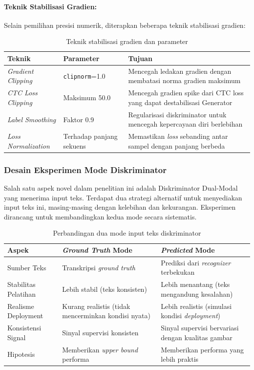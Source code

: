 \documentclass[12pt,a4paper]{article}
\begin{document}
\paragraph{Teknik Stabilisasi Gradien:}
Selain pemilihan presisi numerik, diterapkan beberapa teknik stabilisasi gradien:

\begin{table}[H]
\centering
\caption{Teknik stabilisasi gradien dan parameter}
\label{tab:gradient-stabilization}
\small
\begin{tabular}{|l|l|p{6.5cm}|}
\hline
\textbf{Teknik} & \textbf{Parameter} & \textbf{Tujuan} \\ \hline
\textit{Gradient Clipping} & \texttt{clipnorm}=1.0 & Mencegah ledakan gradien dengan membatasi norma gradien maksimum \\ \hline
\textit{CTC Loss Clipping} & Maksimum 50.0 & Mencegah gradien spike dari CTC loss yang dapat destabilisasi Generator \\ \hline
\textit{Label Smoothing} & Faktor 0.9 & Regularisasi diskriminator untuk mencegah kepercayaan diri berlebihan \\ \hline
\textit{Loss Normalization} & Terhadap panjang sekuens & Memastikan \textit{loss} sebanding antar sampel dengan panjang berbeda \\ \hline
\end{tabular}
\end{table}

\subsubsection{Desain Eksperimen Mode Diskriminator}
Salah satu aspek novel dalam penelitian ini adalah Diskriminator Dual-Modal yang menerima input teks. Terdapat dua strategi alternatif untuk menyediakan input teks ini, masing-masing dengan kelebihan dan kekurangan. Eksperimen dirancang untuk membandingkan kedua mode secara sistematis.

\begin{table}[H]
\centering
\caption{Perbandingan dua mode input teks diskriminator}
\label{tab:discriminator-modes}
\small
\begin{tabular}{|l|p{5.5cm}|p{5.5cm}|}
\hline
\textbf{Aspek} & \textbf{\textit{Ground Truth} Mode} & \textbf{\textit{Predicted} Mode} \\ \hline
Sumber Teks & Transkripsi \textit{ground truth} & Prediksi dari \textit{recognizer} terbekukan \\ \hline
Stabilitas Pelatihan & Lebih stabil (teks konsisten) & Lebih menantang (teks mengandung kesalahan) \\ \hline
Realisme Deployment & Kurang realistis (tidak mencerminkan kondisi nyata) & Lebih realistis (simulasi kondisi \textit{deployment}) \\ \hline
Konsistensi Signal & Sinyal supervisi konsisten & Sinyal supervisi bervariasi dengan kualitas gambar \\ \hline
Hipotesis & Memberikan \textit{upper bound} performa & Memberikan performa yang lebih praktis \\ \hline
\end{tabular}
\end{table}
\end{document}
